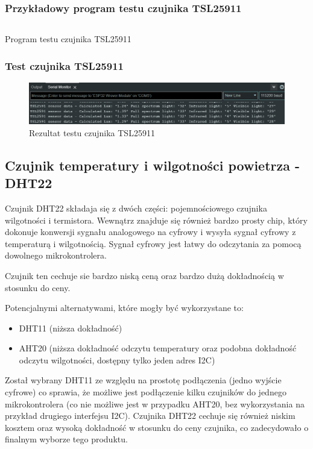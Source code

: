 \documentclass[12pt,a4paper]{article}
\begin{document}
\subsubsection{Przykładowy program testu czujnika TSL25911}

\begin{code}[H]
\inputminted[frame=lines,baselinestretch=1,breaklines,linenos,xleftmargin=1.5em]{c}{../proj/tsl2591-test/tsl2591-test.ino}

\caption{Program testu czujnika TSL25911}
\end{code}

\subsubsection{Test czujnika TSL25911}
\begin{figure}[H]
    \centering
    \includegraphics[width=\textwidth]{tsl2591-test.png}
    \caption{Rezultat testu czujnika TSL25911}
\end{figure}

\subsection{Czujnik temperatury i wilgotności powietrza - DHT22}

Czujnik DHT22 składaja się z dwóch części: pojemnościowego czujnika wilgotności i termistora. Wewnątrz znajduje się również bardzo prosty chip, który dokonuje konwersji sygnału analogowego na cyfrowy i wysyła sygnał cyfrowy z temperaturą i wilgotnością. Sygnał cyfrowy jest łatwy do odczytania za pomocą dowolnego mikrokontrolera.

Czujnik ten cechuje sie bardzo niską ceną oraz bardzo dużą dokładnością w stosunku do ceny.

Potencjalnymi alternatywami, które mogły być wykorzystane to:
\begin{itemize}
    \item DHT11 (niższa dokładność)
    \item AHT20 (niższa dokładność odczytu temperatury oraz podobna dokładność odczytu wilgotności, dostępny tylko jeden adres I2C)
\end{itemize}

Został wybrany DHT11 ze względu na prostotę podłączenia (jedno wyjście cyfrowe) co sprawia, że możliwe jest podłączenie kilku czujników do jednego mikrokontrolera (co nie możliwe jest w przypadku AHT20, bez wykorzystania na przykład drugiego interfejsu I2C). Czujnika DHT22 cechuje się również niskim kosztem oraz wysoką dokładność w stosunku do ceny czujnika, co zadecydowało o finalnym wyborze tego produktu. 
\end{document}
